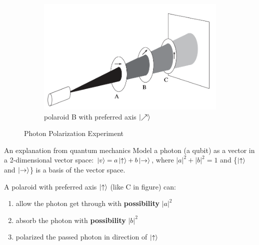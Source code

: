 \documentclass{beamer}
\begin{document}
\begin{frame}
\begin{figure}
    \begin{subfigure}[b]{0.3\textwidth}
      \centering
      \includegraphics[scale=0.12]{figures/polarization-2}
      \caption{polaroid B with preferred axis $\ket{\nearrow}$}
      \label{fig:polarization-2}
    \end{subfigure}
    \caption{Photon Polarization Experiment\tiny\cite{gentleintroduction}}
    \label{fig:Polarization-3}
  \end{figure}

  \begin{block}{An explanation from quantum mechanics}
    Model a photon (a qubit) as a vector in a 2-dimensional vector space:
    $\ket{v} = a\ket{\uparrow}+ b\ket{\rightarrow}$,
    where $|a|^{2}+|b|^{2}=1$ and \{$\ket{\uparrow}$ and $\ket{\rightarrow}$\} is a basis of the vector space.
    \par
    A polaroid with preferred axis $\ket{\uparrow}$ (like C in figure) can:
    \begin{enumerate}[I]
      \item allow the photon get through with \textbf{possibility} $|a|^2$
      \item absorb the photon with \textbf{possibility} $|b|^2$
      \item polarized the passed photon in direction of $\ket{\uparrow}$
    \end{enumerate}
  \end{block}
\end{frame}
\end{document}
